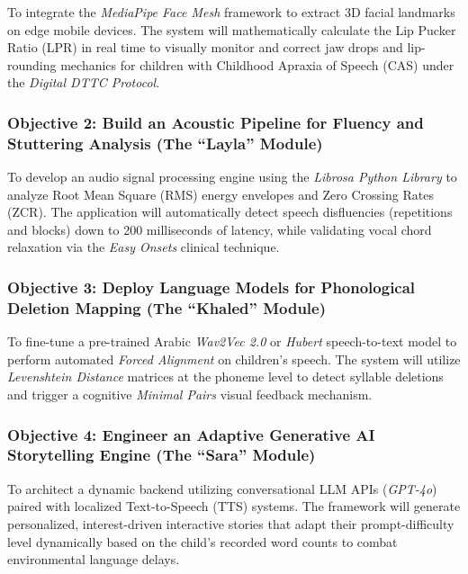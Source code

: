 \documentclass[
  letterpaper,
  DIV=11,
  numbers=noendperiod]{scrartcl}
\begin{document}
To integrate the \emph{MediaPipe Face Mesh} framework to extract 3D
facial landmarks on edge mobile devices. The system will mathematically
calculate the Lip Pucker Ratio (LPR) in real time to visually monitor
and correct jaw drops and lip-rounding mechanics for children with
Childhood Apraxia of Speech (CAS) under the \emph{Digital DTTC
Protocol}.

\subsubsection{Objective 2: Build an Acoustic Pipeline for Fluency and
Stuttering Analysis (The ``Layla''
Module)}\label{objective-2-build-an-acoustic-pipeline-for-fluency-and-stuttering-analysis-the-layla-module}

To develop an audio signal processing engine using the \emph{Librosa
Python Library} to analyze Root Mean Square (RMS) energy envelopes and
Zero Crossing Rates (ZCR). The application will automatically detect
speech disfluencies (repetitions and blocks) down to 200 milliseconds of
latency, while validating vocal chord relaxation via the \emph{Easy
Onsets} clinical technique.

\subsubsection{Objective 3: Deploy Language Models for Phonological
Deletion Mapping (The ``Khaled''
Module)}\label{objective-3-deploy-language-models-for-phonological-deletion-mapping-the-khaled-module}

To fine-tune a pre-trained Arabic \emph{Wav2Vec 2.0} or \emph{Hubert}
speech-to-text model to perform automated \emph{Forced Alignment} on
children's speech. The system will utilize \emph{Levenshtein Distance}
matrices at the phoneme level to detect syllable deletions and trigger a
cognitive \emph{Minimal Pairs} visual feedback mechanism.

\subsubsection{Objective 4: Engineer an Adaptive Generative AI
Storytelling Engine (The ``Sara''
Module)}\label{objective-4-engineer-an-adaptive-generative-ai-storytelling-engine-the-sara-module}

To architect a dynamic backend utilizing conversational LLM APIs
(\emph{GPT-4o}) paired with localized Text-to-Speech (TTS) systems. The
framework will generate personalized, interest-driven interactive
stories that adapt their prompt-difficulty level dynamically based on
the child's recorded word counts to combat environmental language
delays.
\end{document}
